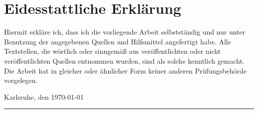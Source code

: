 
\chapter*{Eidesstattliche Erklärung}
\thispagestyle{empty}

Hiermit erkläre ich, dass ich die vorliegende Arbeit selbstständig und nur unter Benutzung der angegebenen Quellen und Hilfsmittel angefertigt habe. Alle Textstellen, die wörtlich oder sinngemäß aus veröffentlichten oder nicht veröffentlichten Quellen entnommen wurden, sind als solche kenntlich gemacht. Die Arbeit hat in gleicher oder ähnlicher Form keiner anderen Prüfungsbehörde vorgelegen.
\vspace{2\baselineskip}

\noindent Karlsruhe, den \today
\begin{flushright}
	\parbox{5cm}{
		\rule{5cm}{.5pt}
		\centering \raisebox{1.5mm}{Lukas Finna}
	}
\end{flushright}